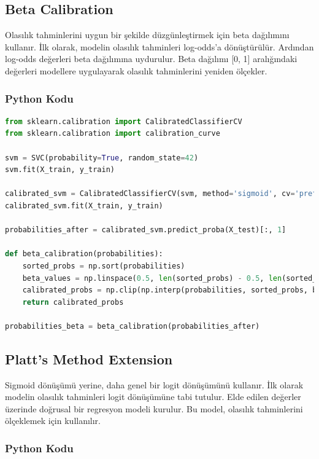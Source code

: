 \newpage

\subsection{Beta Calibration}
Olasılık tahminlerini uygun bir şekilde düzgünleştirmek için beta dağılımını kullanır. İlk olarak, modelin olasılık tahminleri log-odds'a dönüştürülür. Ardından log-odds değerleri beta dağılımına uydurulur. Beta dağılımı [0, 1] aralığındaki değerleri modellere uygulayarak olasılık tahminlerini yeniden ölçekler.

\subsubsection{Python Kodu}

\begin{lstlisting}[language=Python, caption=Scikit-learn'de Beta Calibration örneği.]
from sklearn.calibration import CalibratedClassifierCV
from sklearn.calibration import calibration_curve

svm = SVC(probability=True, random_state=42)
svm.fit(X_train, y_train)

calibrated_svm = CalibratedClassifierCV(svm, method='sigmoid', cv='prefit')
calibrated_svm.fit(X_train, y_train)

probabilities_after = calibrated_svm.predict_proba(X_test)[:, 1]

def beta_calibration(probabilities):
    sorted_probs = np.sort(probabilities)
    beta_values = np.linspace(0.5, len(sorted_probs) - 0.5, len(sorted_probs)) / len(sorted_probs)
    calibrated_probs = np.clip(np.interp(probabilities, sorted_probs, beta_values), 0, 1)
    return calibrated_probs

probabilities_beta = beta_calibration(probabilities_after)
\end{lstlisting}

\newpage

\subsection{Platt's Method Extension}
Sigmoid dönüşümü yerine, daha genel bir logit dönüşümünü kullanır. İlk olarak modelin olasılık tahminleri logit dönüşümüne tabi tutulur. Elde edilen değerler üzerinde doğrusal bir regresyon modeli kurulur. Bu model, olasılık tahminlerini ölçeklemek için kullanılır.

\subsubsection{Python Kodu}

